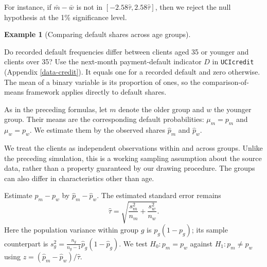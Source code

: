 \documentclass[
  11pt,
]{book}
\theoremstyle{definition}
\theoremstyle{definition}
\newtheorem{example}{Example}[chapter]
\theoremstyle{definition}
\theoremstyle{definition}
\theoremstyle{remark}
\begin{document}
For instance, if \(\bar{m}-\bar{w}\) is not in \([-2.58\hat\tau,2.58\hat\tau]\), then we reject the null hypothesis at the 1\% significance level.

\begin{example}[Comparing default shares across age groups]
\protect\hypertarget{exm:comparSmplMeans}{}\label{exm:comparSmplMeans}

Do recorded default frequencies differ between clients aged 35 or younger and clients over 35? Use the next-month payment-default indicator \(D\) in \texttt{UCIcredit} (Appendix \ref{data-credit}). It equals one for a recorded default and zero otherwise. The mean of a binary variable is its proportion of ones, so the comparison-of-means framework applies directly to default shares.

As in the preceding formulas, let \(m\) denote the older group and \(w\) the younger group. Their means are the corresponding default probabilities: \(\mu_m=p_m\) and \(\mu_w=p_w\). We estimate them by the observed shares \(\widehat p_m\) and \(\widehat p_w\).

\begin{table}[H]
\centering\begingroup\fontsize{10}{12}\selectfont

\endgroup{}
\end{table}

We treat the clients as independent observations within and across groups. Unlike the preceding simulation, this is a working sampling assumption about the source data, rather than a property guaranteed by our drawing procedure. The groups can also differ in characteristics other than age.

Estimate \(p_m-p_w\) by \(\widehat p_m-\widehat p_w\). The estimated standard error remains
\[
\widehat\tau=\sqrt{\frac{s_m^2}{n_m}+\frac{s_w^2}{n_w}}.
\]
Here the population variance within group \(g\) is \(p_g(1-p_g)\); its sample counterpart is \(s_g^2=\frac{n_g}{n_g-1}\widehat p_g(1-\widehat p_g)\). We test \(H_0:p_m=p_w\) against \(H_1:p_m\ne p_w\) using \(z=(\widehat p_m-\widehat p_w)/\widehat\tau\).


\end{example}
\end{document}
